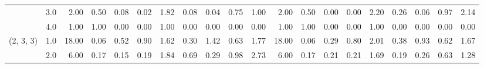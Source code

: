 \begin{tabular}{llrrrrrrrrrrrrrrrrrr}
          & 3.0 &               2.00 &                     0.50 &                                 0.08 &                             0.02 &                           1.82 &                                               0.08 &                                            0.04 &                                            0.75 &                                        1.00 &               2.00 &                     0.50 &                                 0.00 &                             0.00 &                           2.20 &                                               0.26 &                                            0.06 &                                            0.97 &                                        2.14 \\
          & 4.0 &               1.00 &                     1.00 &                                 0.00 &                             0.00 &                           1.00 &                                               0.00 &                                            0.00 &                                            0.00 &                                        0.00 &               1.00 &                     1.00 &                                 0.00 &                             0.00 &                           1.00 &                                               0.00 &                                            0.00 &                                            0.00 &                                        0.00 \\
(2, 3, 3) & 1.0 &              18.00 &                     0.06 &                                 0.52 &                             0.90 &                           1.62 &                                               0.30 &                                            1.42 &                                            0.63 &                                        1.77 &              18.00 &                     0.06 &                                 0.29 &                             0.80 &                           2.01 &                                               0.38 &                                            0.93 &                                            0.62 &                                        1.67 \\
          & 2.0 &               6.00 &                     0.17 &                                 0.15 &                             0.19 &                           1.84 &                                               0.69 &                                            0.29 &                                            0.98 &                                        2.73 &               6.00 &                     0.17 &                                 0.21 &                             0.21 &                           1.69 &                                               0.19 &                                            0.26 &                                            0.63 &                                        1.28 \\

\end{tabular}
